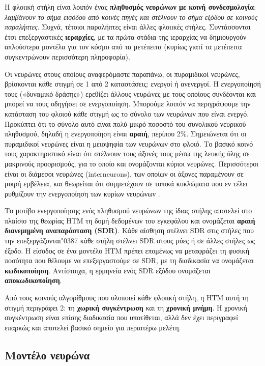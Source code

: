 	Η φλοιική στήλη είναι λοιπόν ένας \textbf{πληθυσμός νευρώνων με κοινή συνδεσμολογία}: \textit{λαμβάνουν το σήμα εισόδου από κοινές πηγές και στέλνουν το σήμα εξόδου σε κοινούς παραλήπτες}.
	Συχνά, τέτοιοι παραλήπτες είναι άλλες φλοιικές στήλες.
	Συντάσσονται έτσι επεξεργαστικές \textbf{ιεραρχίες}, με τα πρώτα στάδια της ιεραρχίας να δημιουργούν απλούστερα μοντέλα για τον κόσμο από τα μετέπειτα
	(κυρίως γιατί τα μετέπειτα συγκεντρώνουν περισσότερη πληροφορία).

	Οι νευρώνες στους οποίους αναφερόμαστε παραπάνω, οι πυραμιδικοί νευρώνες, βρίσκονται κάθε στιγμή σε 1 από 2 καταστάσεις: ενεργοί ή ανενεργοί.
	Η ενεργοποίησή τους («δυναμικό δράσης») ερεθίζει άλλους νευρώνες με τους οποίους συνδέονται και μπορεί να τους οδηγήσει σε ενεργοποίηση.
	Μπορούμε λοιπόν να περιγράψουμε την κατάσταση του φλοιού κάθε στιγμή ως το σύνολο των νευρώνων που είναι ενεργό.
	Προκύπτει ότι το σύνολο αυτό είναι πολύ μικρό ποσοστό του συνολικού νευρικού πληθυσμού, δηλαδή η ενεργοποίηση είναι \textbf{αραιή}, περίπου 2\%.
	Σημειώνεται ότι οι πυραμιδικοί νευρώνες είναι η μειοψηφία των νευρώνων στο φλοιό.
	Το βασικό κοινό τους χαρακτηριστικό είναι ότι στέλνουν τους άξονές τους μέσω της λευκής ύλης σε μακρινούς προορισμούς, για το οποίο και ονομάζονται κύριοι νευρώνες.
	Περισσότεροι είναι οι διάμεσοι νευρώνες (interneurons), των οποίων οι άξονες παραμένουν σε μικρή εμβέλεια, και θεωρείται ότι συμμετέχουν σε τοπικά κυκλώματα
	που εν τέλει ρυθμίζουν την ενεργοποίηση των κυρίων νευρώνων \parencite{freundInterneurons2008}.

	Το μοτίβο ενεργοποίησης ενός πληθυσμού νευρώνων της ίδιας στήλης αποτελεί στο πλαίσιο της θεωρίας HTM τη δομή δεδομένων του εγκεφάλου
	και ονομάζεται \textbf{αραιή διανεμημένη αναπαράσταση (SDR)}.
	Κάθε αίσθηση στέλνει SDR στις στήλες που την επεξεργάζονται\char"0387  κάθε στήλη στέλνει SDR στους μύες ή σε άλλες στήλες ως έξοδο.
	Η είσοδος σε ένα μοντέλο HTM πρέπει επομένως να μεταφράζει τη φυσική ποσότητα που θέλουμε να επεξεργαστούμε σε SDR, με τη διαδικασία να ονομάζεται \textbf{κωδικοποίηση}.
	Αντίστοιχα, η ερμηνεία ενός SDR εξόδου ονομάζεται \textbf{αποκωδικοποίηση}.

	Από τους κοινούς αλγορίθμους που υλοποιεί κάθε φλοιική στήλη, η HTM αυτή τη στιγμή περιγράφει 2: τη \textbf{χωρική συγκέντρωση} και τη \textbf{χρονική μνήμη}.
	Η χρονική συγκέντρωση είναι επίσης διαδικασία που υποτίθεται, αλλά δεν έχει περιγραφεί επαρκώς και αποτελεί βασικό σημείο για περαιτέρω μελέτη.

\subsection{Μοντέλο νευρώνα} \label{htm:model_neuron}

